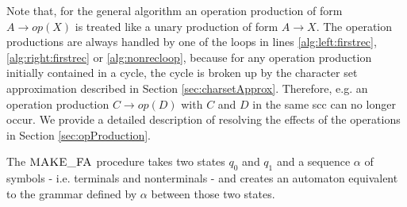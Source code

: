 Note that, for the general algorithm an operation production of form $A \rightarrow op(X)$ is treated like a unary production of form $A \rightarrow X$. The operation productions are always handled by one of the loops in lines \ref{alg:left:firstrec}, \ref{alg:right:firstrec} or \ref{alg:nonrecloop}, because for any operation production initially contained in a cycle, the cycle is broken up by the character set approximation described in Section \ref{sec:charsetApprox}.
Therefore, e.g. an operation production $C \rightarrow op(D)$ with $C$ and $D$ in the same \ac{scc} can no longer occur.
We provide a detailed description of resolving the effects of the operations in Section \ref{sec:opProduction}.

The $\textproc{MAKE\_FA}$ procedure takes two states $q_0$ and $q_1$ and a sequence $\alpha$ of symbols - i.e. terminals and nonterminals - and creates an automaton equivalent to the grammar defined by $\alpha$ between those two states.
\newpage
